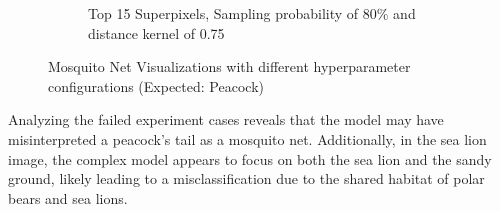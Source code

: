 \begin{figure}
\begin{subfigure}[t]{0.32\textwidth}
        \caption{Top 15 Superpixels, Sampling probability of 80\% and distance kernel of 0.75}
    \end{subfigure}
    \caption{Mosquito Net Visualizations with different hyperparameter configurations (Expected: Peacock)}
\end{figure}


Analyzing the failed experiment cases reveals that the model may have misinterpreted a peacock's tail as a mosquito net. 
Additionally, in the sea lion image, the complex model appears to focus on both the sea lion and the sandy ground, likely leading to a misclassification due to the shared habitat of polar bears and sea lions.


